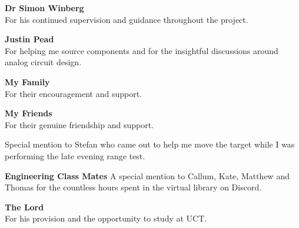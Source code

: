 \textbf{Dr Simon Winberg}\\
For his continued supervision and guidance throughout the project.

\textbf{Justin Pead}\\
For helping me source components and for the insightful discussions around analog circuit design.

\textbf{My Family}\\
For their encouragement and support.

\textbf{My Friends}\\
For their genuine friendship and support.

Special mention to Stefan who came out to help me move the target while I was performing the late evening range test.

\textbf{Engineering Class Mates}
A special mention to Callum, Kate, Matthew and Thomas for the countless hours spent in the virtual library on Discord.

\textbf{The Lord}\\
For his provision and the opportunity to study at UCT.


